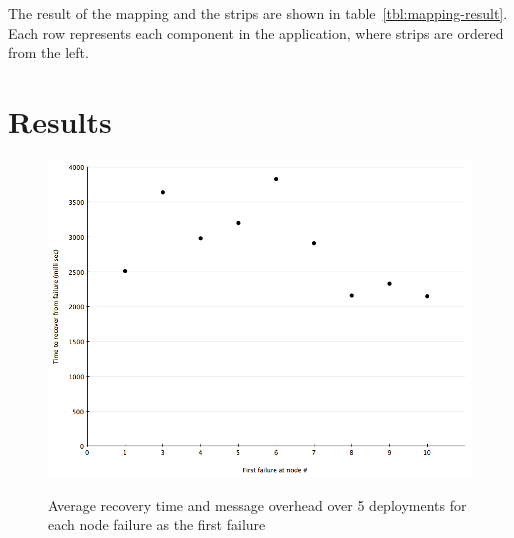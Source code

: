 The result of the mapping and the strips are shown in
table~\ref{tbl:mapping-result}. Each row represents each component in the
application, where strips are ordered from the left.







\section{Results}
\label{s:results}

\begin{figure}[h!]
\caption{Average recovery time and message overhead over 5 deployments for each
node failure as the first failure}
\centering
    \includegraphics[width=\linewidth]{figures/results-average-recovery-time-plus-message-overhead}
\label{fig:results-average-recovery-time-plus-message-overhead}
\end{figure}


